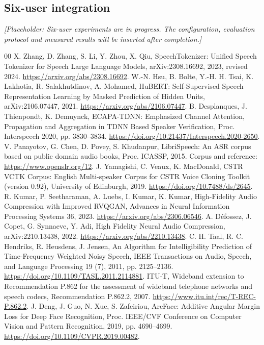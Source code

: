 \documentclass[final,5p,times,twocolumn]{elsarticle}
\begin{document}
\subsection{Six-user integration}
\noindent\textit{[Placeholder: Six-user experiments are in progress. The configuration, evaluation protocol and measured results will be inserted after completion.]}


\begin{thebibliography}{00}
X. Zhang, D. Zhang, S. Li, Y. Zhou, X. Qiu,
SpeechTokenizer: Unified Speech Tokenizer for Speech Large Language Models,
arXiv:2308.16692, 2023, revised 2024.
\url{https://arxiv.org/abs/2308.16692}.
W.-N. Hsu, B. Bolte, Y.-H. H. Tsai, K. Lakhotia, R. Salakhutdinov, A. Mohamed,
HuBERT: Self-Supervised Speech Representation Learning by Masked Prediction of Hidden Units,
arXiv:2106.07447, 2021.
\url{https://arxiv.org/abs/2106.07447}.
B. Desplanques, J. Thienpondt, K. Demuynck,
ECAPA-TDNN: Emphasized Channel Attention, Propagation and Aggregation in TDNN Based Speaker Verification,
Proc. Interspeech 2020, pp. 3830--3834.
\url{https://doi.org/10.21437/Interspeech.2020-2650}.
V. Panayotov, G. Chen, D. Povey, S. Khudanpur,
LibriSpeech: An ASR corpus based on public domain audio books,
Proc. ICASSP, 2015. Corpus and reference:
\url{https://www.openslr.org/12}.
J. Yamagishi, C. Veaux, K. MacDonald,
CSTR VCTK Corpus: English Multi-speaker Corpus for CSTR Voice Cloning Toolkit (version 0.92),
University of Edinburgh, 2019.
\url{https://doi.org/10.7488/ds/2645}.
R. Kumar, P. Seetharaman, A. Luebs, I. Kumar, K. Kumar,
High-Fidelity Audio Compression with Improved RVQGAN,
Advances in Neural Information Processing Systems 36, 2023.
\url{https://arxiv.org/abs/2306.06546}.
A. D\'efossez, J. Copet, G. Synnaeve, Y. Adi,
High Fidelity Neural Audio Compression,
arXiv:2210.13438, 2022.
\url{https://arxiv.org/abs/2210.13438}.
C. H. Taal, R. C. Hendriks, R. Heusdens, J. Jensen,
An Algorithm for Intelligibility Prediction of Time-Frequency Weighted Noisy Speech,
IEEE Transactions on Audio, Speech, and Language Processing 19 (7), 2011, pp. 2125--2136.
\url{https://doi.org/10.1109/TASL.2011.2114881}.
ITU-T, Wideband extension to Recommendation P.862 for the assessment of wideband telephone networks and speech codecs,
Recommendation P.862.2, 2007.
\url{https://www.itu.int/rec/T-REC-P.862.2}.
J. Deng, J. Guo, N. Xue, S. Zafeiriou,
ArcFace: Additive Angular Margin Loss for Deep Face Recognition,
Proc. IEEE/CVF Conference on Computer Vision and Pattern Recognition, 2019, pp. 4690--4699.
\url{https://doi.org/10.1109/CVPR.2019.00482}.
\end{thebibliography}
\end{document}

